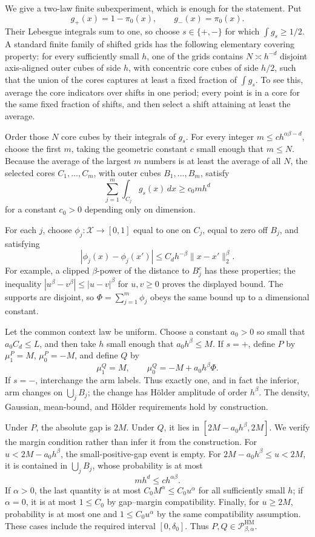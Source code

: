 We give a two-law finite subexperiment, which is enough for the statement.  Put
\[
g_+(x)=1-\pi_0(x),\qquad g_-(x)=\pi_0(x).
\]
Their Lebesgue integrals sum to one, so choose \(s\in\{+,-\}\) for which \(\int g_s\geq1/2\).  A standard finite family of shifted grids has the following elementary covering property: for every sufficiently small \(h\), one of the grids contains \(N\asymp h^{-d}\) disjoint axis-aligned outer cubes of side \(h\), with concentric core cubes of side \(h/2\), such that the union of the cores captures at least a fixed fraction of \(\int g_s\).  To see this, average the core indicators over shifts in one period; every point is in a core for the same fixed fraction of shifts, and then select a shift attaining at least the average.

Order those \(N\) core cubes by their integrals of \(g_s\).  For every integer \(m\leq c h^{\alpha\beta-d}\), choose the first \(m\), taking the geometric constant \(c\) small enough that \(m\leq N\).  Because the average of the largest \(m\) numbers is at least the average of all \(N\), the selected cores \(C_1,\ldots,C_m\), with outer cubes \(B_1,\ldots,B_m\), satisfy
\[
\sum_{j=1}^m\int_{C_j}g_s(x)\,dx\geq c_0mh^d
\]
for a constant \(c_0>0\) depending only on dimension.

For each \(j\), choose \(\phi_j:\mathcal X\to[0,1]\) equal to one on \(C_j\), equal to zero off \(B_j\), and satisfying
\[
|\phi_j(x)-\phi_j(x')|\leq C_dh^{-\beta}\|x-x'\|_2^\beta.
\]
For example, a clipped \(\beta\)-power of the distance to \(B_j^c\) has these properties; the inequality \(|u^\beta-v^\beta|\leq|u-v|^\beta\) for \(u,v\geq0\) proves the displayed bound.  The supports are disjoint, so \(\Phi=\sum_{j=1}^m\phi_j\) obeys the same bound up to a dimensional constant.

Let the common context law be uniform.  Choose a constant \(a_0>0\) so small that \(a_0C_d\leq L\), and then take \(h\) small enough that \(a_0h^\beta\leq M\).  If \(s=+\), define \(P\) by \(\mu_1^P=M\), \(\mu_0^P=-M\), and define \(Q\) by
\[
\mu_1^Q=M,
\qquad
\mu_0^Q=-M+a_0h^\beta\Phi.
\]
If \(s=-\), interchange the arm labels.  Thus exactly one, and in fact the inferior, arm changes on \(\bigcup_jB_j\); the change has H\"older amplitude of order \(h^\beta\).  The density, Gaussian, mean-bound, and H\"older requirements hold by construction.

Under \(P\), the absolute gap is \(2M\).  Under \(Q\), it lies in \([2M-a_0h^\beta,2M]\).  We verify the margin condition rather than infer it from the construction.  For \(u<2M-a_0h^\beta\), the small-positive-gap event is empty.  For \(2M-a_0h^\beta\leq u<2M\), it is contained in \(\bigcup_jB_j\), whose probability is at most
\[
m h^d\leq c h^{\alpha\beta}.
\]
If \(\alpha>0\), the last quantity is at most \(C_0M^\alpha\leq C_0u^\alpha\) for all sufficiently small \(h\); if \(\alpha=0\), it is at most \(1\leq C_0\) by gap--margin compatibility.  Finally, for \(u\geq2M\), probability is at most one and \(1\leq C_0u^\alpha\) by the same compatibility assumption.  These cases include the required interval \([0,\delta_0]\).  Thus \(P,Q\in\mathcal P_{\beta,\alpha}^{\mathrm{HM}}\).

